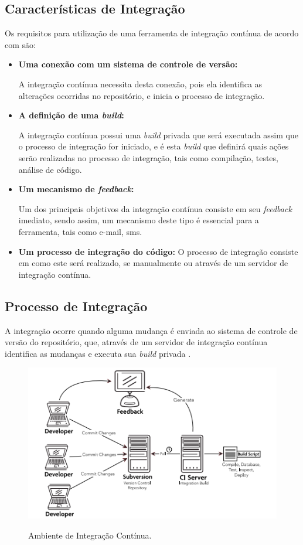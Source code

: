 \subsection{Características de Integração}
Os requisitos para utilização de uma ferramenta de integração contínua de acordo com  são:
\begin{itemize}
\item {\textbf{Uma conexão com um sistema de controle de versão:}}

A integração contínua necessita desta conexão, pois ela identifica as alterações ocorridas no repositório, e inicia o processo de integração.

\item {\textbf{A definição de uma \textit{build}:}}

A integração contínua possui uma \textit{build} privada que será executada assim que o processo de integração for iniciado, e é esta \textit{build} que definirá quais ações serão realizadas no processo de integração, tais como compilação, testes, análise de código.
\item {\textbf{Um mecanismo de \textit{feedback}:}}

Um dos principais objetivos da integração contínua consiste em seu \textit{feedback} imediato, sendo assim, um mecanismo deste tipo é essencial para a ferramenta, tais como e-mail, sms.
\item {\textbf{Um processo de integração do código: }}
O processo de integração consiste em como este será realizado, se manualmente ou através de um servidor de integração contínua.

\end{itemize}

\subsection{Processo de Integração}
A integração ocorre quando alguma mudança é enviada ao sistema de controle de versão do repositório, que, através de um servidor de integração contínua identifica as mudanças e executa sua \textit{build} privada \cite{mraz2013}. 


\begin{figure}[H]
\centering
\caption[Ambiente de Integração Contínua]{Ambiente de Integração Contínua.}
\includegraphics[scale=1.0]{./images/CI}
\label{fig:CI}
\end{figure}

